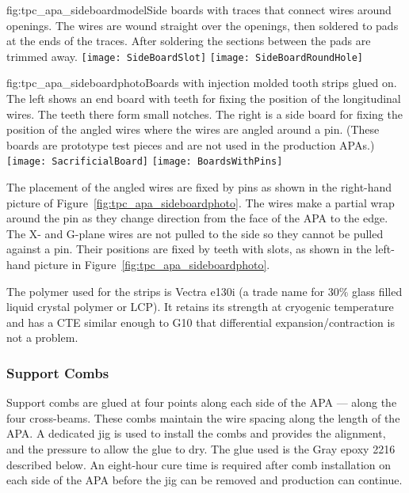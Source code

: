 \begin{dunefigure}{fig:tpc_apa_sideboardmodel}{Side boards with traces that connect wires around openings.  The wires are wound straight over the openings, then soldered to pads at the ends of the traces.  After soldering the sections between the pads are trimmed away.}
\texttt{[image: SideBoardSlot]} 
\texttt{[image: SideBoardRoundHole]} 
\end{dunefigure}


\begin{dunefigure}{fig:tpc_apa_sideboardphoto}{Boards with injection molded tooth strips glued on.  The left shows an end board with teeth for fixing the position of the longitudinal wires.  The teeth there form small notches. The right is a side board for fixing the position of the angled wires where the wires are angled around a pin. (These boards are prototype test pieces and are not used in the production APAs.)}
\texttt{[image: SacrificialBoard]} 
\texttt{[image: BoardsWithPins]} 
\end{dunefigure}

The placement of the angled wires are fixed by pins 
as shown in the right-hand picture of Figure~\ref{fig:tpc_apa_sideboardphoto}.  The wires make a partial wrap around the pin as they change direction from the face of the APA to the edge.  The X- and G-plane wires are not pulled to the side so they cannot be pulled against a pin.  Their positions are fixed 
by teeth with slots, as shown in the left-hand picture in Figure~\ref{fig:tpc_apa_sideboardphoto}. 
	
The polymer used for the strips is Vectra e130i (a trade name for 30$\%$ glass filled liquid crystal polymer or LCP). It retains its strength at cryogenic temperature and has a CTE similar enough to G10 that differential expansion/contraction is not a problem.


\subsubsection{Support Combs}

Support combs are glued at four points along each side of the APA --- along the four cross-beams. These combs maintain the wire spacing along the length of the APA. A dedicated jig is used to install the combs and provides the alignment, and the pressure to allow the glue to dry. The glue used is the Gray epoxy 2216 described below. An eight-hour cure time is required after comb installation on each side of the APA before the jig can be removed and production can continue.

